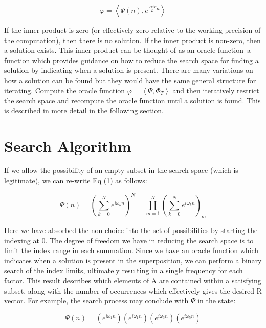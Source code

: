 \documentclass[reqno]{amsart}
\theoremstyle{definition}
\theoremstyle{remark}
\begin{document}
\begin{equation}
\varphi  =  \left \langle \Psi (n), e^{  \frac{2\pi i T}{L} n }\right \rangle  
\end{equation}

If the inner product is zero (or effectively zero relative to the working precision of the computation), then there is no solution. If the inner product is non-zero, then a solution exists. This inner product can be thought of as an oracle function--a function which provides guidance on how to reduce the search space for finding a solution by indicating when a solution is present. There are many variations on how a solution can be found but they would have the same general structure for iterating. Compute the oracle function $\varphi  =  \left \langle \Psi, \Phi _T\right \rangle $ and then iteratively restrict the search space and recompute the oracle function until a solution is found. This is described in more detail in the following section.

\newpage
\section{Search Algorithm}
If we allow the possibility of an empty subset in the search space (which is legitimate), we can re-write Eq (1) as follows:

\begin{equation}
\Psi (n) = \left (\sum_{k=0}^{N}e^{i\omega _k n} \right )^{N} = \coprod_{m=1}^{N} \left (  \sum_{k=0}^{N} e^{i \omega _k n}  \right ) _m
\end{equation}

Here we have absorbed the non-choice into the set of possibilities by starting the indexing at 0. The degree of freedom we have in reducing the search space is to limit the index range in each summation. Since we have an oracle function which indicates when a solution is present in the superposition, we can perform a binary search of the index limits, ultimately resulting in a single frequency for each factor. This result describes which elements of A are contained within a satisfying subset, along with the number of occurrences which effectively gives the desired R vector. For example, the search process may conclude with $\Psi$ in the state:

\begin{equation}
\Psi (n) = \left (e^{i\omega _1 n} \right ) \left (e^{i\omega _1 n} \right ) \left (e^{i\omega _3 n} \right ) \left (e^{i\omega _5 n} \right )
\end{equation}
\end{document}
